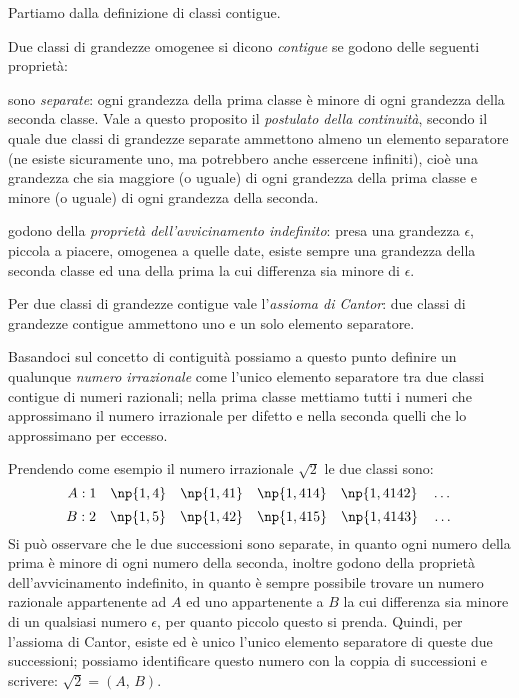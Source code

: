 Partiamo dalla definizione di classi contigue.
\begin{definizione}
Due classi di grandezze omogenee si dicono \emph{contigue} se godono 
delle seguenti proprietà:
\begin{itemize*}
\item sono \emph{separate}: ogni grandezza della prima classe è 
minore di ogni grandezza della seconda classe. Vale a questo proposito 
il \emph{postulato della continuità}, secondo il quale due classi di 
grandezze separate ammettono almeno un elemento separatore (ne esiste 
sicuramente uno, ma potrebbero anche essercene infiniti), cioè una 
grandezza che sia maggiore (o uguale) di ogni grandezza della prima 
classe e minore (o uguale) di ogni grandezza della seconda.
\item godono della \emph{proprietà dell'avvicinamento indefinito}: 
presa una grandezza $\epsilon$, piccola a piacere, omogenea a quelle 
date, esiste sempre una grandezza della seconda classe ed una della 
prima la cui differenza sia minore di $\epsilon$.
\end{itemize*}
\end{definizione}

Per due classi di grandezze contigue vale l'\emph{assioma di Cantor}: 
due classi di grandezze contigue ammettono uno e un solo elemento 
separatore.

Basandoci sul concetto di contiguità possiamo a questo punto definire 
un qualunque \emph{numero irrazionale} come l'unico elemento 
separatore tra due classi contigue di numeri razionali; nella prima 
classe mettiamo tutti i numeri che approssimano il numero irrazionale 
per difetto e nella seconda quelli che lo approssimano per eccesso.

Prendendo come esempio il numero irrazionale $\sqrt{2}$ le due classi 
sono:
\[A: 1\quad \np{1,4}\quad \np{1,41}\quad \np{1,414}\quad 
\np{1,4142}\quad \ldots{}\]
\[B: 2\quad \np{1,5}\quad \np{1,42}\quad \np{1,415}\quad 
\np{1,4143}\quad \ldots{}\]
Si può osservare che le due successioni sono separate, in quanto ogni 
numero della prima è minore di ogni numero della seconda, inoltre 
godono della proprietà dell'avvicinamento indefinito, in quanto è 
sempre possibile trovare un numero razionale appartenente ad $A$ ed 
uno appartenente a $B$ la cui differenza sia minore di un qualsiasi 
numero $\epsilon$, per quanto piccolo questo si prenda.
Quindi, per l'assioma di Cantor, esiste ed è unico l'unico elemento 
separatore di queste due successioni; possiamo identificare questo 
numero con la coppia di successioni e scrivere: $\sqrt{2} = (A\text{, 
}B)$.

